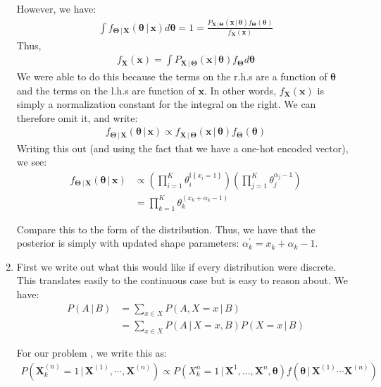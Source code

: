 \documentclass[submit]{harvardml}
\newcommand{\given}{\,|\,}
\newcommand{\Dir}{\text{Dirichlet}}
\renewcommand{\v}{\boldsymbol}
\begin{document}
\begin{enumerate}[label=(\alph*)]
		However, we have:
		\begin{align*}
			\int {f_{\v{\Theta} \given \v{X}} (\v{\theta} \given \v{x}) d \v{\theta}} = 1 = \frac{P_{\v{X} \given \v{\Theta}}(\v{x} \given \v{\theta}) f_{\v{\Theta}}(\v{\theta})}{f_{\v{X}}(\v{x})}
		\end{align*}
		Thus,
		\begin{align*}
			f_{\v{X}}(\v{x}) = \int{ P_{\v{X} \given \v{\Theta}}(\v{x} \given \v{\theta}) f_{\v{\Theta}} d\v{\theta}}
		\end{align*}
		We were able to do this because the terms on the r.h.s are a function of $\v\theta$ and the terms on the l.h.s are function of $\v{x}$. In other words, $f_{\v X} (\v x)$ is simply a normalization constant for the integral on the right. We can therefore omit it, and write:
		\begin{align}
			f_{\v{\Theta} \given \v{X}} (\v{\theta} \given \v{x}) \propto f_{\v{X} \given \v{\Theta}}(\v{x} \given \v{\theta}) f_{\v{\Theta}}(\v{\theta})
		\end{align}
		Writing this out (and using the fact that we have a one-hot encoded vector), we see:
		\begin{align*}
		f_{\v{\Theta} \given \v{X}} (\v{\theta} \given \v{x}) &\propto \left(\prod_{i=1}^K \theta_i ^ {\mathbb{I}\left\{x_i = 1\right\}} \right) \left(\prod_{j=1}^K \theta_j ^ {\alpha_j - 1} \right) \\
		 &= \prod_{k=1}^K \theta_k ^ {(x_k + \alpha_k - 1)}
		\end{align*}
		
		Compare this to the form of the {\Dir}  distribution. Thus, we have that the posterior is simply {\Dir} with updated shape parameters: $\alpha^{'} _k = x_k + \alpha_k - 1$.
		
		\item {} First we write out what this would like if every distribution were discrete. This translates easily to the continuous case but is easy to reason about. We have:
		\begin{align*}
		P(A \given B) &= \sum_{x \in X}P(A, X=x \given B) \\
					&= \sum_{x \in X} P(A \given X=x, B) P(X=x \given B)
		\end{align*}
		
		For our problem , we write this as:
		\begin{align}
		P(\v{X}^{(n)}_{k} = 1 \given \v{X}^{(1)}, \cdots, \v{X}^{(n)}) \propto  
			P(X^{n}_k = 1 \given \v{X}^{1}, ...	, \v{X}^{n}, \v{\theta}) f(\v{\theta} \given \v{X}^{(1)} \cdots \v{X}^{(n)})
		\end{align}
		

\end{enumerate}
\end{document}
